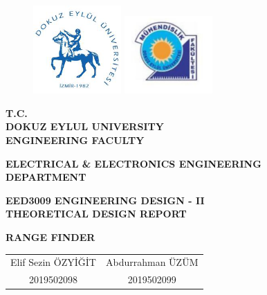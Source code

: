 \documentclass[12pt, a4paper]{article}
\begin{document}
    \begin{titlepage}
        \begin{center}

            \begin{figure}

                \subfloat
                {%
                    \includegraphics[width=0.3\textwidth]{deulogo.png}
                }
                \hfill
                \subfloat
                {%
                    \includegraphics[width=0.3\textwidth]{facultylogo.png}
                }

            \end{figure}

            \textbf{T.C.\\}
            \textbf{DOKUZ EYLUL UNIVERSITY\\}
            \textbf{ENGINEERING FACULTY\\}

            \vspace*{1 cm}
            \textbf{ELECTRICAL \& ELECTRONICS ENGINEERING\\}
            \textbf{DEPARTMENT\\}

            \vspace*{1 cm}
            \textbf{EED3009 ENGINEERING DESIGN - II\\}
            \textbf{THEORETICAL DESIGN REPORT\\}

            \textbf{RANGE FINDER}

            \vspace*{1 cm}

        
            \begin{table}[H]\centering
                \begin{tabular}{cc}
                    Elif Sezin ÖZYİĞİT \hspace{1cm}  & \hspace{1cm} Abdurrahman ÜZÜM \\
                    2019502098         \hspace{1cm}  & \hspace{1cm} 2019502099       \\             
                \end{tabular}
            \end{table}


\end{center}
\end{titlepage}
\end{document}

